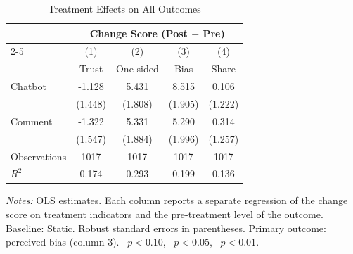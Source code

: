 \begin{table}[htbp]
\centering
\caption{Treatment Effects on All Outcomes}
\label{tab:all}
\begin{tabular}{l*{4}{c}}
\toprule
 & \multicolumn{4}{c}{Change Score (Post $-$ Pre)} \\
\cmidrule(lr){2-5}
                    &\multicolumn{1}{c}{(1)}&\multicolumn{1}{c}{(2)}&\multicolumn{1}{c}{(3)}&\multicolumn{1}{c}{(4)}\\
                    &\multicolumn{1}{c}{Trust}&\multicolumn{1}{c}{One-sided}&\multicolumn{1}{c}{Bias}&\multicolumn{1}{c}{Share}\\
\midrule
Chatbot             &      -1.128         &       5.431\sym{***}&       8.515\sym{***}&       0.106         \\
                    &     (1.448)         &     (1.808)         &     (1.905)         &     (1.222)         \\
\addlinespace
Comment             &      -1.322         &       5.331\sym{***}&       5.290\sym{***}&       0.314         \\
                    &     (1.547)         &     (1.884)         &     (1.996)         &     (1.257)         \\
\midrule
Observations        &        1017         &        1017         &        1017         &        1017         \\
$R^2$               &       0.174         &       0.293         &       0.199         &       0.136         \\
\bottomrule
\end{tabular}
\par\vspace{4pt}
\begin{minipage}{\textwidth}
\footnotesize \textit{Notes:} OLS estimates. Each column reports a separate regression of the change score on treatment indicators and the pre-treatment level of the outcome. Baseline: Static. Robust standard errors in parentheses. Primary outcome: perceived bias (column 3). \sym{*}~$p<0.10$, \sym{**}~$p<0.05$, \sym{***}~$p<0.01$.
\end{minipage}
\end{table}
